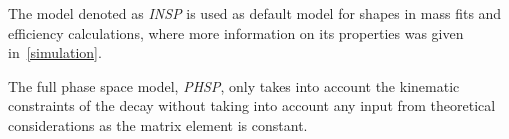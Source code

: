 The model denoted as \textit{INSP} is used as default model for shapes in mass fits and efficiency calculations, where more information on its properties was given in~\autoref{simulation}.

The full phase space model, \textit{PHSP}, only takes into account the kinematic constraints of the decay without taking into account any input from theoretical considerations as the matrix element is constant.


%
%


